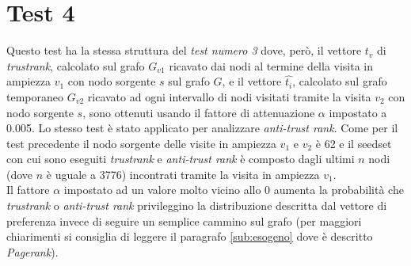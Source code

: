 \section{Test 4}
Questo test ha la stessa struttura del \textit{test numero 3} dove, però,  il vettore \(t_v\) di \textit{trustrank}, calcolato sul grafo \(G_{v1}\) ricavato dai nodi al termine della visita in ampiezza \(v_1\) con nodo sorgente \(s\)  sul grafo \(G\), e il vettore \(\hat{t_i}\), calcolato sul grafo temporaneo \(G_{v2}\) ricavato ad ogni intervallo di nodi visitati tramite la visita \(v_2\) con nodo sorgente \(s\), sono ottenuti usando il fattore di attenuazione \(\alpha\) impostato a 0.005. Lo stesso test è stato applicato per analizzare \textit{anti-trust rank}. Come per il test precedente il nodo sorgente delle visite in ampiezza \(v_1\) e \(v_2\) è 62  e il seedset con cui sono eseguiti \textit{trustrank} e \textit{anti-trust rank} è composto dagli ultimi \(n\) nodi (dove \(n\) è uguale a 3776)  incontrati tramite la visita in ampiezza \(v_1\).\\
Il fattore \(\alpha\) impostato ad un valore molto vicino allo 0 aumenta la probabilità che \textit{trustrank} o \textit{anti-trust rank}  privileggino la distribuzione descritta dal vettore di preferenza invece di seguire un semplice cammino sul grafo (per maggiori chiarimenti si consiglia di leggere il paragrafo \ref{sub:esogeno} dove è descritto \textit{Pagerank}).


